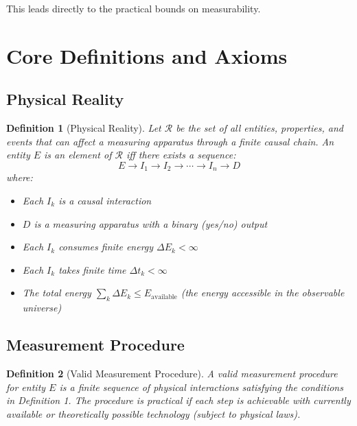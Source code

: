 \documentclass[aps,preprint,showpacs,showkeys]{revtex4}%
\newtheorem{definition}{Definition}
\begin{document}
This leads directly to the practical bounds on measurability.

\section{Core Definitions and Axioms}

\subsection{Physical Reality}

\begin{definition}[Physical Reality]
Let $\mathcal{R}$ be the set of all entities, properties, and events that
can affect a measuring apparatus through a finite causal chain. An entity $E$
is an element of $\mathcal{R}$ iff there exists a sequence: 
\begin{equation}
E \rightarrow I_1 \rightarrow I_2 \rightarrow \cdots \rightarrow I_n
\rightarrow D
\end{equation}
where:

\begin{itemize}
\item Each $I_k$ is a causal interaction

\item $D$ is a measuring apparatus with a binary (yes/no) output

\item Each $I_k$ consumes finite energy $\Delta E_k < \infty$

\item Each $I_k$ takes finite time $\Delta t_k < \infty$

\item The total energy $\sum_k \Delta E_k \le E_{\text{available}}$ (the
energy accessible in the observable universe)
\end{itemize}
\end{definition}

\subsection{Measurement Procedure}

\begin{definition}[Valid Measurement Procedure]
A valid measurement procedure for entity $E$ is a finite sequence of
physical interactions satisfying the conditions in Definition 1. The
procedure is \emph{practical} if each step is achievable with currently
available or theoretically possible technology (subject to physical laws).
\end{definition}
\end{document}
